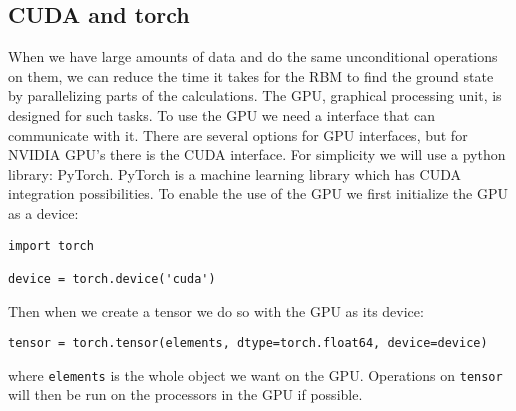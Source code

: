 \subsection{CUDA and torch}

When we have large amounts of data and do the same unconditional operations on them, we can reduce the time it takes for the RBM to find the ground state by parallelizing parts of the calculations. The GPU, graphical processing unit, is designed for such tasks. To use the GPU we need a interface that can communicate with it. There are several options for GPU interfaces, but for NVIDIA\cite{NVIDIA} GPU's there is the CUDA\cite{cuda} interface. For simplicity we will use a python library: PyTorch\cite{paszke2019pytorch}. PyTorch is a machine learning library which has CUDA integration possibilities. To enable the use of the GPU we first initialize the GPU as a device:

\begin{verbatim}
import torch

device = torch.device('cuda')
\end{verbatim}

Then when we create a tensor we do so with the GPU as its device:

\begin{verbatim}
tensor = torch.tensor(elements, dtype=torch.float64, device=device)
\end{verbatim}

where \texttt{elements} is the whole object we want on the GPU. Operations on \texttt{tensor} will then be run on the processors in the GPU if possible.
